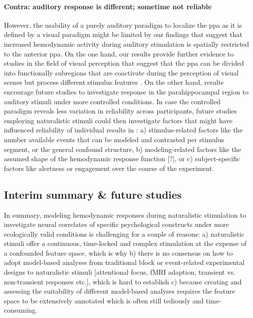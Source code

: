 \paragraph{Contra: auditory response is different; sometime not reliable}

%
However, the usability of a purely auditory paradigm to localize the \ac{ppa} as
it is defined by a visual paradigm might be limited by our findings that suggest
that increased hemodynamic activity during auditory stimulation is spatially
restricted to the anterior \ac{ppa}.
%
On the one hand, our results provide further evidence to studies in the field of
visual perception that suggest that the \ac{ppa} can be divided into
functionally subregions that are coactivate during the perception of visual
scenes but process different stimulus features
\citep{aminoff2007parahippocampal, baldassano2013differential}.
%
On the other hand, results encourage future studies to investigate response in
the parahippocampal region to auditory stimuli under more controlled conditions.
%
In case the controlled paradigm reveals less variation in reliability across
participants, future studies employing naturalistic stimuli could then
investigate factors that might have influenced reliability of individual results
in \citet{haeusler2022processing}:
%
a) stimulus-related factors like the number available events that can be modeled
and contrasted per stimulus segment, or the general confound structure,
%
b) modeling-related factors like the assumed shape of the hemodynamic response
function [?], or
%
c) subject-specific factors like alertness or engagement over the course of the
experiment.



\subsection{Interim summary \& future studies}



In summary, modeling hemodynamic responses during naturalistic stimulation to
investigate neural correlates of specific psychological constructs under more
ecologically valid conditions is challenging for a couple of reasons:
%
a) naturalistic stimuli offer a continuous, time-locked and complex stimulation
at the expense of a confounded feature space, which is why
%
b) there is no consensus on how to adopt model-based analyses from traditional
block or event-related experimental designs to naturalistic stimuli [attentional
focus, fMRI adaption, transient vs. non-transient responses etc.], which is hard
to establish
%
c) because creating and assessing the suitability of different model-based
analyses requires the feature space to be extensively annotated which is often
still tediously and time-consuming.

